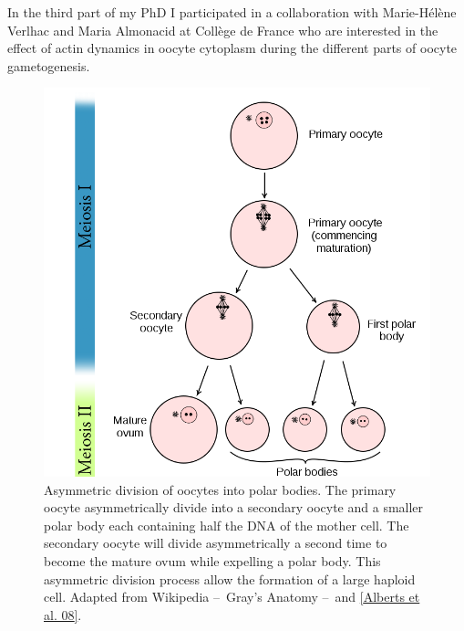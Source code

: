 \documentclass[A4paperpaper,11pt,english]{sphinxmanual}
\begin{document}
In the third part of my PhD I participated in a collaboration with Marie-Hélène
Verlhac and Maria Almonacid at Collège de France who are interested in the
effect of actin dynamics in oocyte cytoplasm during the different parts of
oocyte gametogenesis.
\begin{figure}[htbp]
\centering
\capstart

\includegraphics[width=0.800\linewidth]{oocyte-polar.png}
\caption{Asymmetric division of oocytes into polar bodies. The primary oocyte
asymmetrically divide into a secondary oocyte and a smaller polar body each
containing half the DNA of the mother cell. The secondary oocyte will
divide asymmetrically a second time to become the mature ovum while
expelling a polar body. This asymmetric division process allow the
formation of a large haploid cell. Adapted from Wikipedia – Gray's
Anatomy – and {\hyperref[parts/part1:alberts2008]{{[}Alberts et al. 08{]}}}.}\label{parts/part1:fig-asymetric-division}\end{figure}
\end{document}

